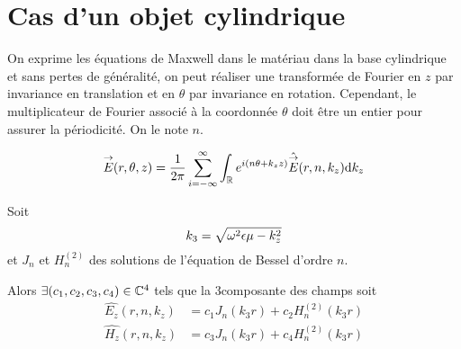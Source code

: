 \section{Cas d'un objet cylindrique}


    \begin{figure}[!hbt]
        \centering
        \begin{tikzpicture}
            
        \end{tikzpicture}
    \end{figure}

    On exprime les équations de Maxwell dans le matériau dans la base cylindrique et sans pertes de généralité, on peut réaliser une transformée de Fourier en $z$ par invariance en translation et en $\theta$ par invariance en rotation. Cependant, le multiplicateur de Fourier associé à la coordonnée $\theta$ doit être un entier pour assurer la périodicité. On le note $n$.

    \begin{equation}
        \vE(r,\theta,z) = \frac{1}{2\pi}\sum_{i=-\infty}^{\infty}\int_{\RR} e^{i(n \theta + k_z z )}\hat{\vE} (r,n,k_z) \dd{k_z}
    \end{equation}

    \begin{prop}
        Soit
        \begin{equation}
            k_3 = \sqrt{\w^2\eps\mu - k_z^2}
        \end{equation}
        et $J_n$ et $H_n^{(2)}$ des solutions de l'équation de Bessel d'ordre $n$.
        
        Alors $\exists (c_1,c_2,c_3,c_4) \in \CC^4$ tels que la 3\ieme composante des champs soit
        \begin{subequations}
            \begin{align}
                \hat{E_z}(r,n,k_z) &= c_1 J_n\left(k_3r\right) + c_2 H_n^{(2)}\left(k_3r\right)
                \\
                \hat{H_z}(r,n,k_z) &= c_3 J_n\left(k_3r\right) + c_4 H_n^{(2)}\left(k_3r\right)
            \end{align}
        \end{subequations}
    \end{prop}

